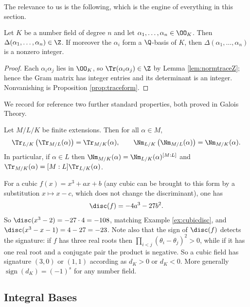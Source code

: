 The relevance to us is the following, which is the engine of everything in this section.

\begin{lemma}\label{lem:discint}
	Let $K$ be a number field of degree $n$ and let $\alpha_1, \dots, \alpha_n \in \OO_K$. Then $\Delta(\alpha_1,\dots,\alpha_n) \in \Z$. If moreover the $\alpha_i$ form a $\Q$-basis of $K$, then $\Delta(\alpha_1,\dots,\alpha_n)$ is a nonzero integer.
\end{lemma}

\begin{proof}
	Each $\alpha_i\alpha_j$ lies in $\OO_K$, so $\Tr(\alpha_i\alpha_j) \in \Z$ by Lemma \ref{lem:normtraceZ}; hence the Gram matrix has integer entries and its determinant is an integer. Nonvanishing is Proposition \ref{prop:traceform}.
\end{proof}

We record for reference two further standard properties, both proved in Galois Theory.

\begin{proposition}[Transitivity]\label{prop:transitivity}
	Let $M/L/K$ be finite extensions. Then for all $\alpha \in M$,
	$$\Tr_{L/K}\left(\Tr_{M/L}(\alpha)\right) = \Tr_{M/K}(\alpha), \qquad \Nm_{L/K}\left(\Nm_{M/L}(\alpha)\right) = \Nm_{M/K}(\alpha).$$
	In particular, if $\alpha \in L$ then $\Nm_{M/K}(\alpha) = \Nm_{L/K}(\alpha)^{[M:L]}$ and $\Tr_{M/K}(\alpha) = [M:L]\Tr_{L/K}(\alpha)$.
\end{proposition}

\begin{example}\label{ex:cubicdiscformula}
	For a cubic $f(x) = x^3+ax+b$ (any cubic can be brought to this form by a substitution $x \mapsto x - c$, which does not change the discriminant), one has
	$$\disc(f) = -4a^3-27b^2.$$
	So $\disc(x^3-2) = -27\cdot4 = -108$, matching Example \ref{ex:cubicdisc}, and $\disc(x^3-x-1) = 4-27 = -23$. Note also that the sign of $\disc(f)$ detects the signature: if $f$ has three real roots then $\prod_{i<j}(\theta_i-\theta_j)^2 > 0$, while if it has one real root and a conjugate pair the product is negative. So a cubic field has signature $(3,0)$ or $(1,1)$ according as $d_K > 0$ or $d_K < 0$. More generally $\operatorname{sign}(d_K) = (-1)^s$ for any number field.
\end{example}

\subsection{Integral Bases}

